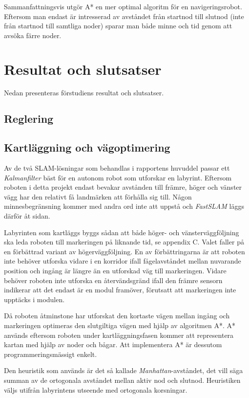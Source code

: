 \documentclass[11pt]{article}
\begin{document}
\begin{flushleft}
Sammanfattningsvis utgör A* en mer optimal algoritm för en navigeringsrobot. Eftersom man endast är intresserad av avståndet från startnod till slutnod (inte från startnod till samtliga noder) sparar man både minne och tid genom att avsöka färre noder. 

\pagebreak
\section{Resultat och slutsatser}
Nedan presenteras förstudiens resultat och slutsatser.
\subsection{Reglering}

\subsection{Kartläggning och vägoptimering}
Av de två SLAM-lösningar som behandlas i rapportens huvuddel passar ett \emph{Kalmanfilter} bäst för en autonom robot som utforskar en labyrint.  Eftersom roboten i detta projekt endast bevakar avstånden till främre, höger och vänster vägg har den relativt få landmärken att förhålla sig till. Någon minnesbegränsning kommer med andra ord inte att uppstå och \emph{FastSLAM} läggs därför åt sidan.

Labyrinten som kartläggs byggs sådan att både höger- och vänsterväggföljning ska leda roboten till markeringen på liknande tid, se appendix C. Valet faller på en förbättrad variant av högerväggföljning. En av förbättringarna är att roboten inte behöver utforska vidare i en korridor ifall fågelavståndet mellan nuvarande position och ingång är längre än en utforskad väg till markeringen. Vidare behöver roboten inte utforska en återvändsgränd ifall den främre sensorn indikerar att det endast är en modul framöver, förutsatt att markeringen inte upptäcks i modulen. 

Då roboten åtminstone har utforskat den kortaste vägen mellan ingång och markeringen optimeras den slutgiltiga vägen med hjälp av algoritmen A*. A* används eftersom roboten under kartläggningsfasen kommer att representera kartan med hjälp av noder och bågar. Att implementera A* är dessutom programmeringsmässigt enkelt.

Den heuristik som används är det så kallade \emph{Manhattan}-avståndet, det vill säga summan av de ortogonala avståndet mellan aktiv nod och slutnod. Heuristiken väljs utifrån labyrintens utseende med ortogonala korsningar. 


\end{flushleft}
\end{document}
